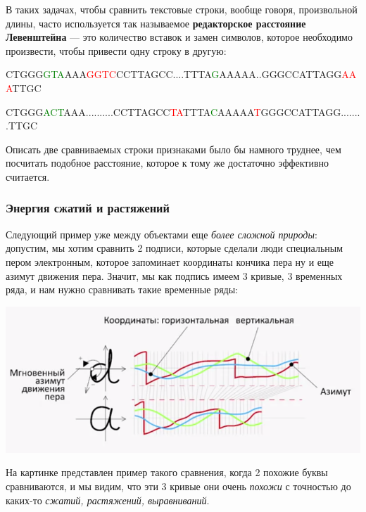 \documentclass{article}
\begin{document}
В таких задачах, чтобы сравнить текстовые строки, вообще говоря, произвольной длины, часто используется так называемое \textbf{редакторское расстояние Левенштейна} --- это количество вставок и замен символов, которое необходимо произвести, чтобы привести одну строку в другую:

\begin{center}

CTGGG\textcolor{green}{GTA}AAA\textcolor{red}{GGTC}CCTTAGCC....TTTA\textcolor{green}{G}AAAAA..GGGCCATTAGG\textcolor{red}{AAA}TTGC

CTGGG\textcolor{green}{ACT}AAA..........CCTTAGCC\textcolor{red}{TA}TTTA\textcolor{green}{C}AAAAA\textcolor{red}{T}GGGCCATTAGG........TTGC
\end{center}

Описать две сравниваемых строки признаками было бы намного труднее, чем посчитать подобное расстояние, которое к тому же достаточно эффективно считается.

\subsubsection{Энергия сжатий и растяжений}

Следующий пример уже между объектами еще \textit{более сложной природы}: допустим, мы хотим сравнить 2 подписи, которые сделали люди специальным пером электронным, которое запоминает координаты кончика пера ну и еще азимут движения пера. Значит, мы как подпись имеем 3 кривые, 3 временных ряда, и нам нужно сравнивать такие временные ряды:

\begin{center}
    \includegraphics[scale=0.53]{images/4_1.png}
\end{center}

На картинке представлен пример такого сравнения, когда 2 похожие буквы сравниваются, и мы видим, что эти 3 кривые они очень \textit{похожи} с точностью до каких-то \textit{сжатий, растяжений, выравниваний}.
\end{document}

